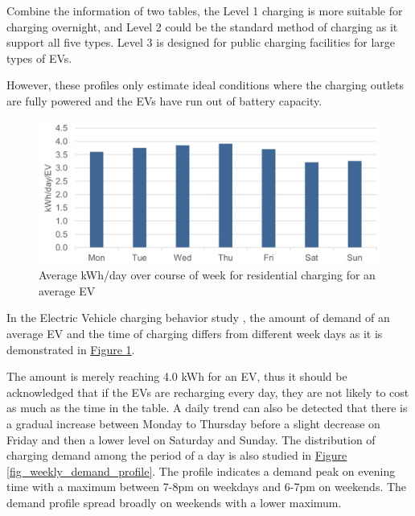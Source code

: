 \documentclass[12pt,a4paper]{report}
\begin{document}
        Combine the information of two tables, the Level 1 charging is more suitable for charging overnight, and Level 2 could be the standard method of charging as it support all five types. Level 3 is designed for public charging facilities for large types of EVs.

        However, these profiles only estimate ideal conditions where the charging outlets are fully powered and the EVs have run out of battery capacity. 
        
        
        \begin{figure}[htbp]
            \centerline{\includegraphics[scale=1]{averageEVchargingamount}}
            \caption{Average kWh/day over course of week for residential charging for an average EV}
            \label{fig_average_ev_charging}
        \end{figure}

        In the Electric Vehicle charging behavior study \cite{report:EVchargingstudy}, the amount of demand of an average EV and the time of charging differs from different week days as it is demonstrated in \hyperref[fig_average_ev_charging]{Figure \ref*{fig_average_ev_charging}}.

        The amount is merely reaching 4.0 kWh for an EV, thus it should be acknowledged that if the EVs are recharging every day, they are not likely to cost as much as the time in the table. A daily trend can also be detected that there is a gradual increase between Monday to Thursday before a slight decrease on Friday and then a lower level on Saturday and Sunday.
        The distribution of charging demand among the period of a day is also studied in \hyperref[fig_weekly_demand_profile]{Figure \ref*{fig_weekly_demand_profile}}. The profile indicates a demand peak on evening time with a maximum between 7-8pm on weekdays and 6-7pm on weekends. The demand profile spread broadly on weekends with a lower maximum.
\end{document}
